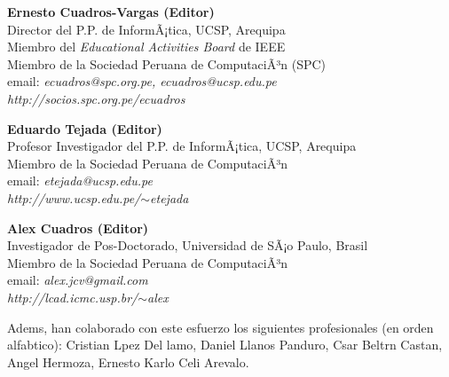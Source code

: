 \begin{center}
\textbf{Ernesto Cuadros-Vargas (Editor)}\\
Director del P.P. de InformÃ¡tica, UCSP, Arequipa\\
Miembro del \textit{Educational Activities Board} de IEEE\\
Miembro de la Sociedad Peruana de ComputaciÃ³n (SPC)\\
email: \textit{ecuadros@spc.org.pe, ecuadros@ucsp.edu.pe}\\
\textit{http://socios.spc.org.pe/ecuadros}
\end{center}

\begin{center}
\textbf{Eduardo Tejada (Editor)}\\
Profesor Investigador del P.P. de InformÃ¡tica, UCSP, Arequipa\\
Miembro de la Sociedad Peruana de ComputaciÃ³n\\
email: \textit{etejada@ucsp.edu.pe}\\
\textit{http://www.ucsp.edu.pe/$\sim$etejada}
\end{center}

\begin{center}
\textbf{Alex Cuadros (Editor)}\\
Investigador de Pos-Doctorado, Universidad de SÃ¡o Paulo, Brasil\\
Miembro de la Sociedad Peruana de ComputaciÃ³n\\
email: \textit{alex.jcv@gmail.com}\\
\textit{http://lcad.icmc.usp.br/$\sim$alex}
\end{center}

Adem s, han colaborado con este esfuerzo los siguientes profesionales (en orden alfab tico): Cristian L pez Del  lamo, Daniel Llanos Panduro, C sar Beltr n Casta  n, Angel Hermoza, Ernesto Karlo Celi Arevalo.





